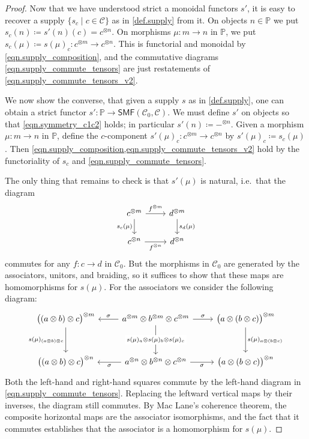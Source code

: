 \documentclass[11pt, oneside, article]{memoir}
\theoremstyle{plain}
\theoremstyle{definition}
\theoremstyle{remark}
\newcommand{\cat}[1]{\mathcal{#1}}%
\newcommand{\Cat}[1]{{\mathsf{#1}}}%
\newcommand{\tpow}[1]{^{\otimes #1}}
\newcommand{\smf}{\Cat{SMF}}
\newcommand{\pp}{\mathbb{P}}
\newcommand{\mob}[1]{#1_0}
\begin{document}
\begin{proof}
Now that we have understood strict a monoidal functors $s'$, it is easy to recover a supply $\{s_c\mid c\in\cat{C}\}$ as in \cref{def.supply} from it. On objects $n\in\pp$ we put $s_c(n)\coloneqq s'(n)(c)=c\tpow{n}$. On morphisms $\mu\colon m\to n$ in $\pp$, we put $s_c(\mu)\coloneqq s(\mu)_c\colon c\tpow{m}\to c\tpow{n}$. This is functorial and monoidal by \cref{eqn.supply_composition}, and the commutative diagrams \eqref{eqn.supply_commute_tensors} are just restatements of \eqref{eqn.supply_commute_tensors_v2}.

We now show the converse, that given a supply $s$ as in \cref{def.supply}, one can obtain a strict functor $s'\colon\pp\to\smf(\mob{\cat{C}},\cat{C})$. We must define $s'$ on objects so that \cref{eqn.symmetry_c1c2} holds; in particular $s'(n)\coloneqq -\tpow{n}$. Given a morphism $\mu\colon m\to n$ in $\pp$, define the $c$-component $s'(\mu)_c\colon c\tpow{m}\to c\tpow{n}$ by $s'(\mu)_c\coloneqq s_c(\mu)$. Then \cref{eqn.supply_composition,eqn.supply_commute_tensors_v2} hold by the functoriality of $s_c$ and \cref{eqn.supply_commute_tensors}.
 
 The only thing that remains to check is that $s'(\mu)$ is natural, i.e.\ that the diagram
 \begin{equation}\label{eqn.C_0_homos}
 \begin{tikzcd}
	c\tpow{m}\ar[d, "s_c(\mu)"']\ar[r, "f\tpow{m}"]&
	d\tpow{m}\ar[d, "s_d(\mu)"]\\
	c\tpow{n}\ar[r, "f\tpow{n}"']&
	d\tpow{n}
\end{tikzcd}
\end{equation}
commutes for any $f\colon c\to d$ in $\mob{\cat{C}}$. But the morphisms in $\mob{\cat{C}}$ are generated by the associators, unitors, and braiding, so it suffices to show that these maps are homomorphisms for $s(\mu)$. For the associators we consider the following diagram:
\[
\begin{tikzcd}[row sep=30pt]
  \big((a\otimes b)\otimes c\big)\tpow{m}\ar[d, "s(\mu)_{(a\otimes b)\otimes c}"']&
  a\tpow{m}\otimes b\tpow{m}\otimes c\tpow{m}\ar[l, "\sigma"']\ar[r, "\sigma"]\ar[d, "s(\mu)_a\otimes s(\mu)_b\otimes s(\mu)_c" description]&
  \big(a\otimes (b\otimes c)\big)\tpow{m}\ar[d, "s(\mu)_{a\otimes (b\otimes c)}"]\\
  \big((a\otimes b)\otimes c\big)\tpow{n}&
  a\tpow{n}\otimes b\tpow{n}\otimes c\tpow{n}\ar[l, "\sigma"]\ar[r, "\sigma"']&
  \big(a\otimes (b\otimes c)\big)\tpow{n}
\end{tikzcd}
\]
Both the left-hand and right-hand squares commute by the left-hand diagram in \cref{eqn.supply_commute_tensors}. Replacing the leftward vertical maps by their inverses, the diagram still commutes. By Mac Lane's coherence theorem, the composite horizontal maps are the associator isomorphisms, and the fact that it commutes establishes that the associator is a homomorphism for $s(\mu)$.


\end{proof}
\end{document}
